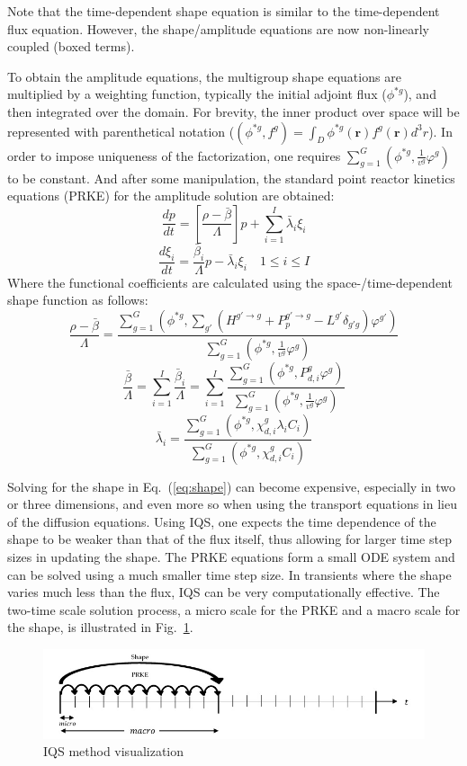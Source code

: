 \documentclass{anstrans}
\renewcommand{\vec}[1]{\bm{#1}} %
\newcommand{\eqt}[1]{Eq.~(\ref{#1})}                     %
\newcommand{\fig}[1]{Fig.~\ref{#1}}                      %
\newcommand{\be}{\begin{equation}}
\newcommand{\ee}{\end{equation}}
\begin{document}
Note that the time-dependent shape equation is similar to the time-dependent flux equation. 
However, the shape/amplitude equations are now non-linearly coupled (boxed terms).

To obtain the amplitude equations, the multigroup shape equations are multiplied by a weighting function, typically the initial adjoint flux ($\phi^{*g}$), and then integrated over the domain.  For brevity, the inner product over space will be represented with parenthetical notation ($\left(\phi^{*g},f^g\right) = \int_D \phi^{*g}(\vec{r})f^g(\vec{r})d^3r
$). In order to impose uniqueness of the factorization, one requires $\sum_{g=1}^G\left(\phi^{*g},\frac{1}{v^g}\varphi^g\right)$ to be constant.  And after some manipulation, the standard point reactor kinetics equations (PRKE) for the amplitude solution are obtained:
\be
\frac{dp}{dt}=\left[\frac{\rho-\bar{\beta}}{\Lambda}\right]p+\sum_{i=1}^I\bar{\lambda}_i\xi_i
\ee
\be
\frac{d\xi_i}{dt}=\frac{\bar{\beta}_i}{\Lambda}p-\bar{\lambda}_i\xi_i \quad 1 \le i \le I 
\ee
Where the functional coefficients are calculated using the space-/time-dependent shape function as follows:
\be
\frac{\rho-\bar{\beta}}{\Lambda}=\frac{ \sum_{g=1}^G\left(\phi^{*g},\sum_{g'}(H^{g' \to g}+P_p^{g' \to g}-L^{g'}\delta_{g'g})\varphi^{g'}\right)}{\sum_{g=1}^G\left(\phi^{*g},\frac{1}{v^g}\varphi^g\right)}
\label{eq:rmb}
\ee
\be
\frac{\bar{\beta}}{\Lambda}=\sum_{i=1}^I\frac{\bar{\beta}_i}{\Lambda}=\sum_{i=1}^I\frac{\sum_{g=1}^G(\phi^{*g}, P_{d,i}^g \varphi^g)}{\sum_{g=1}^G\left(\phi^{*g},\frac{1}{v^g}\varphi^g\right)}
\ee
\be
\bar{\lambda}_i=\frac{\sum_{g=1}^G(\phi^{*g},\chi_{d,i}^g\lambda_i C_i)}{\sum_{g=1}^G(\phi^{*g},\chi_{d,i}^gC_i)}
\label{eq:l}
\ee

Solving for the shape in \eqt{eq:shape} can become expensive, especially in two or three dimensions, and even more so when using the transport equations in lieu of the diffusion equations.  Using IQS, one expects the time dependence of the shape to be weaker than that of the flux itself,  thus allowing for larger time step sizes in updating the shape. The PRKE equations form a small ODE system and can be solved using a much smaller time step size. In transients where the shape varies much less than the flux, IQS can be very computationally effective. The two-time scale solution process, a micro scale for the PRKE and a macro scale for the shape, is illustrated in \fig{fig:iqsviz}.  

\begin{figure}[!htbp]
\includegraphics[width=\linewidth]{IQS_visualization.jpg}
\caption{IQS method visualization}
\label{fig:iqsviz}
\end{figure}
\end{document}
